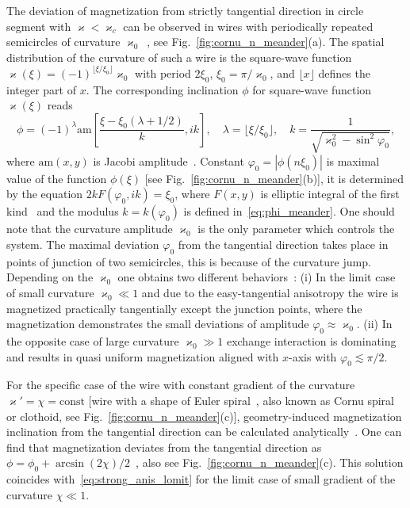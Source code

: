 The deviation of magnetization from  strictly tangential direction in circle segment with $\varkappa<\varkappa_c$ can be observed in wires with periodically repeated semicircles of curvature $\varkappa_0$~\cite{Korniienko19b}, see Fig.~\ref{fig:cornu_n_meander}(a). The spatial distribution of the curvature of such a wire is the square-wave function $\varkappa(\xi) = (-1)^{\lfloor\xi/\xi_0\rfloor}\varkappa_0$ with period $2\xi_0$, $\xi_0=\pi/\varkappa_0$, and $\lfloor x \rfloor$ defines the integer part of $x$. The corresponding inclination $\phi$ for square-wave function $\varkappa(\xi)$ reads~\cite{Korniienko19b}
\begin{equation}\label{eq:phi_meander}
\phi = (-1)^\lambda \text{am}\left[\frac{\xi-\xi_0\left(\lambda+1/2\right)}{k},ik\right],\quad \lambda=\lfloor \xi/\xi_0 \rfloor,\quad k=\frac{1}{\sqrt{\varkappa_0^2-\sin^2\varphi_0}},
\end{equation}
where $\text{am}\left(x,y\right)$ is Jacobi amplitude~\cite{NIST10}. Constant $\varphi_0=|\phi\left(n\xi_0\right)|$ is maximal value of the function $\phi(\xi)$ [see Fig.~\ref{fig:cornu_n_meander}(b)], it is determined by the equation $2kF(\varphi_0,ik) = \xi_0$, where $F(x,y)$ is elliptic integral of the first kind~\cite{NIST10} and the modulus $k = k(\varphi_0)$ is defined in~\eqref{eq:phi_meander}. One should note that the curvature amplitude $\varkappa_0$ is the only parameter which controls the system. The maximal deviation $\varphi_0$ from the tangential direction takes place in points of junction of two semicircles, this is because of the curvature jump. Depending on the $\varkappa_0$ one obtains two different behaviors~\cite{Korniienko19b}: (i) In the limit case of small curvature $\varkappa_0\ll1$ and due to the easy-tangential anisotropy the wire is magnetized practically tangentially except the junction points, where the magnetization demonstrates the small deviations of amplitude $\varphi_0\approx\varkappa_0$. (ii) In the opposite case of large curvature $\varkappa_0\gg1$ exchange interaction is dominating and results in quasi uniform magnetization aligned with $x$-axis with $\varphi_0\lesssim\pi/2$.

For the specific case of the wire with constant gradient of the curvature $\varkappa'=\chi=\text{const}$ [wire with a shape of Euler spiral~\cite{Lawrence14}, also known as Cornu spiral or clothoid, see Fig.~\ref{fig:cornu_n_meander}(c)], geometry-induced magnetization inclination from the tangential direction can be calculated analytically~\cite{Yershov18a}. One can find that magnetization deviates from the tangential direction as $\phi=\phi_0+\arcsin(2\chi)/2$~\cite{Yershov18a}, also see Fig.~\ref{fig:cornu_n_meander}(c). This solution coincides with~\eqref{eq:strong_anis_lomit} for the limit case of small gradient of the curvature $\chi\ll1$.

